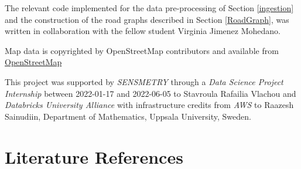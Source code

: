 \documentclass[12pt]{article}
\theoremstyle{definition}
\begin{document}
The relevant code implemented for the data pre-processing of Section \ref{ingestion} and the construction of the road graphs described in Section \ref{RoadGraph}, was written in collaboration with the fellow student Virginia Jimenez Mohedano. 

Map data is copyrighted by  OpenStreetMap contributors and available from \href{https://www.openstreetmap.org}{OpenStreetMap}

This project was supported by {\em SENSMETRY} through a {\em Data Science Project Internship} between 2022-01-17 and 2022-06-05 to Stavroula Rafailia Vlachou and {\em Databricks University Alliance} with infrastructure credits from {\em AWS} to Raazesh Sainudiin, Department of Mathematics, Uppsala University, Sweden.


\section{Literature References}


\end{document}
